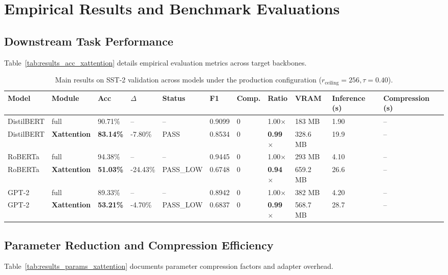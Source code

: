 \section{Empirical Results and Benchmark Evaluations}

\subsection{Downstream Task Performance}
Table~\ref{tab:results_acc_xattention} details empirical evaluation metrics across target backbones.

\begin{table}[t]
\centering
\small
\begin{tabular}{lllllllllll}
\toprule
\textbf{Model} & \textbf{Module} & \textbf{Acc} & \textbf{$\Delta$} & \textbf{Status} & \textbf{F1} & \textbf{Comp.} & \textbf{Ratio} & \textbf{VRAM} & \textbf{Inference (s)} & \textbf{Compression (s)} \\
\midrule
DistilBERT & full & 90.71\% & -- & -- & 0.9099 & 0 & 1.00$\times$ & 183 MB & 1.90 & -- \\
DistilBERT & \textbf{Xattention} & \textbf{83.14\%} & -7.80\% & PASS & 0.8534 & 0 & \textbf{0.99$\times$} & 328.6 MB & 19.9 & -- \\
RoBERTa & full & 94.38\% & -- & -- & 0.9445 & 0 & 1.00$\times$ & 293 MB & 4.10 & -- \\
RoBERTa & \textbf{Xattention} & \textbf{51.03\%} & -24.43\% & PASS\_LOW & 0.6748 & 0 & \textbf{0.94$\times$} & 659.2 MB & 26.6 & -- \\
GPT-2 & full & 89.33\% & -- & -- & 0.8942 & 0 & 1.00$\times$ & 382 MB & 4.20 & -- \\
GPT-2 & \textbf{Xattention} & \textbf{53.21\%} & -4.70\% & PASS\_LOW & 0.6837 & 0 & \textbf{0.99$\times$} & 568.7 MB & 28.7 & -- \\
\bottomrule
\end{tabular}
\caption{Main results on SST-2 validation across models under the production configuration ($r_{\mathrm{ceiling}}=256, \tau=0.40$).}
\label{tab:main_sst2}
\end{table}

\subsection{Parameter Reduction and Compression Efficiency}
Table~\ref{tab:results_params_xattention} documents parameter compression factors and adapter overhead.

